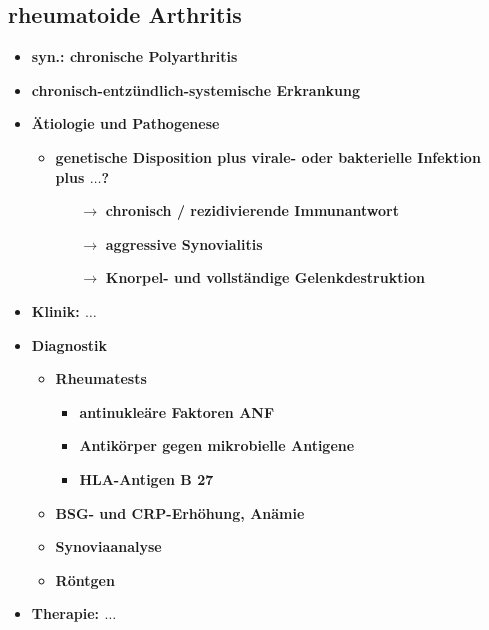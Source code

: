 \subsection{rheumatoide Arthritis}
	\begin{itemize}
		\item \textbf{syn.: chronische Polyarthritis}
		\item \textbf{chronisch-entzündlich-systemische Erkrankung}
		\item \textbf{Ätiologie und Pathogenese}
			\begin{itemize}
				\item \textbf{genetische Disposition plus virale- oder bakterielle Infektion plus $\dots$?}
					\begin{itemize}
						\item[$\rightarrow$] \textbf{chronisch / rezidivierende Immunantwort}
						\item[$\rightarrow$] \textbf{aggressive Synovialitis}
						\item[$\rightarrow$] \textbf{Knorpel- und vollständige Gelenkdestruktion}
					\end{itemize}
			\end{itemize}
		\item \textbf{Klinik: $\dots$}
		\item \textbf{Diagnostik}
			\begin{itemize}
				\item \textbf{Rheumatests}
					\begin{itemize}
						\item \textbf{antinukleäre Faktoren ANF}
						\item \textbf{Antikörper gegen mikrobielle Antigene}
						\item \textbf{HLA-Antigen B 27}
					\end{itemize}
				\item \textbf{BSG- und CRP-Erhöhung, Anämie}
				\item \textbf{Synoviaanalyse}
				\item \textbf{Röntgen}
			\end{itemize}
		\item \textbf{Therapie: $\dots$}
 	\end{itemize}

